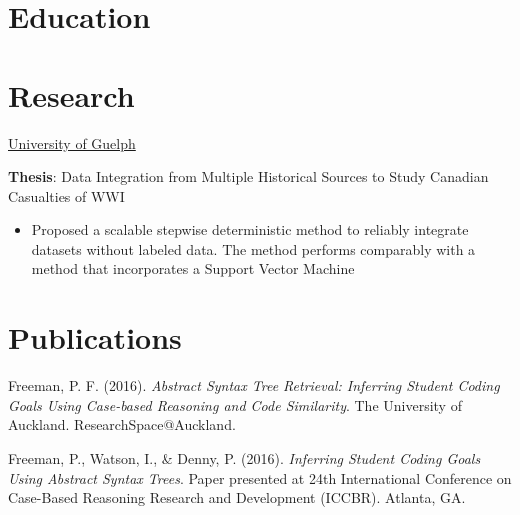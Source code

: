 \documentclass[a4paper]{twentysecondcv}
\begin{document}
\makeprofile{}

\section{Education}
\begin{twenty}
\end{twenty}

\section{Research}
\begin{twenty}
               {\href{http://www.uoguelph.ca/}{University of Guelph}}
               {}
               {\textbf{Thesis}: Data Integration from Multiple Historical
                                 Sources to Study Canadian Casualties of WWI
                    {\begin{itemize}
                        \item Proposed a scalable stepwise deterministic method
                            to reliably integrate datasets without labeled
                            data. The method performs comparably with a method
                            that incorporates a Support Vector Machine
                    \end{itemize}}}
\end{twenty}

\section{Publications}
Freeman, P. F. (2016). \emph{Abstract Syntax Tree Retrieval: Inferring Student
Coding Goals Using Case-based Reasoning and Code Similarity}. The University of
Auckland. ResearchSpace@Auckland.

Freeman, P., Watson, I., \& Denny, P. (2016). \emph{Inferring Student Coding
Goals Using Abstract Syntax Trees}. Paper presented at 24th International
Conference on Case-Based Reasoning Research and Development (ICCBR). Atlanta, GA.\@
\end{document}
